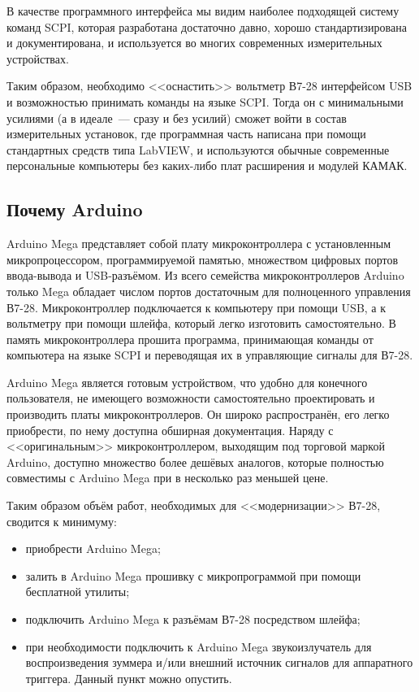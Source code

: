 \documentclass[12pt, a4paper]{article}
\newcommand{\SCPI}{\mbox{SCPI}}
\newcommand{\V}{\mbox{В7-28}}
\newcommand{\Arduino}{Arduino Mega}
\begin{document}
В качестве программного интерфейса мы видим наиболее подходящей систему команд \SCPI, которая разработана достаточно давно, хорошо стандартизирована и документирована, и используется во многих современных измерительных устройствах.

Таким образом, необходимо <<оснастить>> вольтметр \V{} интерфейсом USB и возможностью принимать команды на языке \SCPI. Тогда он с минимальными усилиями (а в идеале~--- сразу и без усилий) сможет войти в состав измерительных установок, где программная часть написана при помощи стандартных средств типа LabVIEW, и используются обычные современные персональные компьютеры без каких-либо плат расширения и модулей КАМАК.

\subsection{Почему Arduino}

\Arduino{} представляет собой плату микроконтроллера с установленным микропроцессором, программируемой памятью, множеством цифровых портов ввода-вывода и USB-разъёмом. Из всего семейства микроконтроллеров Arduino только Mega обладает числом портов достаточным для полноценного управления \V. Микроконтроллер подключается к компьютеру при помощи USB, а к вольтметру при помощи шлейфа, который легко изготовить самостоятельно.  В память микроконтроллера прошита программа, принимающая команды от компьютера на языке \SCPI{} и переводящая их в управляющие сигналы для \V.

\Arduino{} является готовым устройством, что удобно для конечного пользователя, не имеющего возможности самостоятельно проектировать и производить платы микроконтроллеров. Он широко распространён, его легко приобрести, по нему доступна обширная документация. Наряду с <<оригинальным>> микроконтроллером, выходящим под торговой маркой Arduino, доступно множество более дешёвых аналогов, которые полностью совместимы с \Arduino{} при в несколько раз меньшей цене.

Таким образом объём работ, необходимых для <<модернизации>> \V{}, сводится к минимуму:

\begin{itemize}
\item приобрести \Arduino{};
\item залить в \Arduino{} прошивку с микропрограммой при помощи бесплатной утилиты;
\item подключить \Arduino{} к разъёмам \V{} посредством шлейфа;
\item при необходимости подключить к \Arduino{} звукоизлучатель для воспроизведения зуммера и/или внешний источник сигналов для аппаратного триггера. Данный пункт можно опустить.
\end{itemize}
\end{document}
